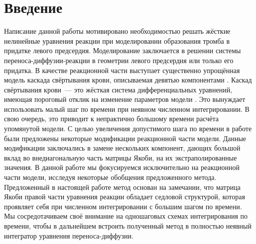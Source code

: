 \chapter{Введение}
\label{chapter:introduction} 

Написание данной работы мотивировано необходимостью решать жёсткие нелинейные уравнения реакции при моделировании образования тромба в придатке левого предсердия.
Моделирование заключается в решении системы переноса-диффузии-реакции в геометрии левого предсердия или только его придатка.
В качестве реакционной части выступает существенно упрощённая модель каскада свёртывания крови, описываемая девятью компонентами \cite{bouchnita2020mathematical}.
Каскад свёртывания крови~--- это жёсткая система дифференциальных уравнений, имеющая пороговый отклик на изменение параметров модели \cite{shen2008threshold}.
Это вынуждает использовать малый шаг по времени при неявном численном интегрировании.
В свою очередь, это приводит к непрактично большому времени расчёта упомянутой модели.
С целью увеличения допустимого шага по времени в работе \cite{vassilevski2020parallel} были предложены некоторые модификации реакционной части модели.
Данные модификации заключались в замене нескольких компонент, дающих большой вклад во внедиагональную часть матрицы Якоби, на их экстраполированные значения.
В данной работе мы фокусируемся исключительно на реакционной части модели, исследуя некоторые обобщения предложенного метода.
Предложенный в настоящей работе метод основан на замечании, что матрица Якоби правой части уравнения реакции обладает седловой структурой,
которая проявляет себя при численном интегрировании с большим шагом по времени.
Мы сосредотачиваем своё внимание на одношаговых схемах интегрирования по времени, чтобы в дальнейшем встроить полученный метод в полностью неявный интегратор уравнения переноса-диффузии.

